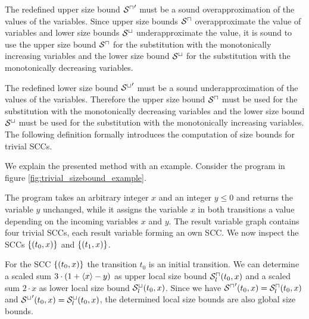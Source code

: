 The redefined upper size bound ${{\mathcal{S}^\sqcap}}'$ must be a sound overapproximation of the values of the variables.
Since upper size bounds ${\mathcal{S}^\sqcap}$ overapproximate the value of variables and lower size bounds ${\mathcal{S}^\sqcup}$ underapproximate the value, it is sound to use the upper size bound ${\mathcal{S}^\sqcap}$ for the substitution with the monotonically increasing variables and the lower size bound ${\mathcal{S}^\sqcup}$ for the substitution with the monotonically decreasing variables.

The redefined lower size bound ${{\mathcal{S}^\sqcup}}'$ must be a sound underapproximation of the values of the variables.
Therefore the upper size bound ${\mathcal{S}^\sqcap}$ must be used for the substitution with the monotonically decreasing variables and the lower size bound ${\mathcal{S}^\sqcup}$ must be used for the substitution with the monotonically increasing variables.
The following definition formally introduces the computation of size bounds for trivial SCCs.



We explain the presented method with an example.
Consider the program in figure \ref{fig:trivial_sizebound_example}.



The program takes an arbitrary integer $x$ and an integer $y \leq 0$ and returns the variable $y$ unchanged, while it assigns the variable $x$ in both transitions a value depending on the incoming variables $x$ and $y$.
The result variable graph contains four trivial SCCs, each result variable forming an own SCC.
We now inspect the SCCs $\lbrace (t_0,x) \rbrace$ and $\lbrace (t_1,x) \rbrace$.

For the SCC $\lbrace (t_0,x) \rbrace$ the transition $t_0$ is an initial transition.
We can determine a scaled sum $3 \cdot (1 + \langle x\rangle - y)$ as upper local size bound ${\mathcal{S}^\sqcap_l}(t_0,x)$ and a scaled sum $2 \cdot x$ as lower local size bound ${\mathcal{S}^\sqcup_l}(t_0,x)$.
Since we have ${\mathcal{S}^\sqcap}'(t_0,x) = {\mathcal{S}^\sqcap_l}(t_0,x)$ and ${\mathcal{S}^\sqcup}'(t_0,x) = {\mathcal{S}^\sqcup_l}(t_0,x)$, the determined local size bounds are also global size bounds.


